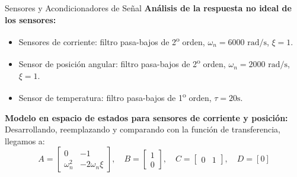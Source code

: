 \documentclass[12pt]{beamer}
\begin{document}
\begin{frame}{Sensores y Acondicionadores de Señal}
    \textbf{Análisis de la respuesta no ideal de los sensores:}
    \begin{itemize}
        \item Sensores de corriente: filtro pasa-bajos de 2\textsuperscript{o} orden, \(\omega_n = 6000 \text{ rad/s}\), \(\xi = 1\).
        \item Sensor de posición angular: filtro pasa-bajos de 2\textsuperscript{o} orden, \(\omega_n = 2000 \text{ rad/s}\), \(\xi = 1\).
        \item Sensor de temperatura: filtro pasa-bajos de 1\textsuperscript{o} orden, \(\tau = 20 \text{s}\).
    \end{itemize}

    \textbf{Modelo en espacio de estados para sensores de corriente y posición:}
    Desarrollando, reemplazando y comparando con la función de transferencia, llegamos a:
    \[
        A = \begin{bmatrix} 0 & -1 \\ \omega_n^2 & -2 \omega_n \xi \end{bmatrix}, \quad 
        B = \begin{bmatrix} 1 \\ 0 \end{bmatrix}, \quad 
        C = \begin{bmatrix} 0 & 1 \end{bmatrix}, \quad D = [0]
    \]
\end{frame}
\end{document}
